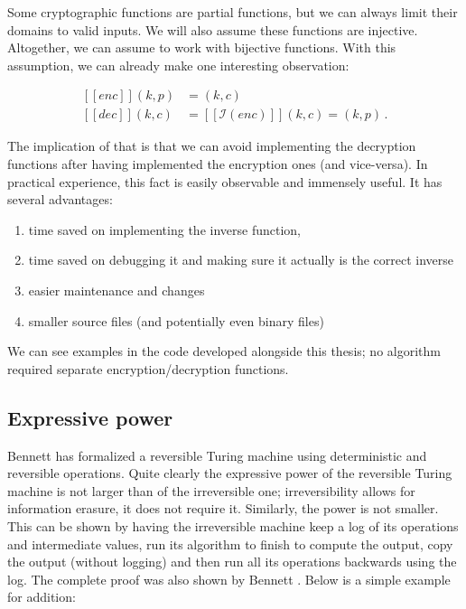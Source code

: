 \documentclass[a4paper,10pt,openright]{memoir}
\def\enc{\ensuremath{\mathit{enc}}}
\def\dec{\ensuremath{\mathit{dec}}}
\newcommand{\inv}[1]{\ensuremath{\mathcal{I}(#1)}}
\newcommand{\exe}[1]{\ensuremath{[\![#1]\!]}}
\begin{document}
Some cryptographic functions are partial functions, but we can always 
limit their domains to valid inputs. We will also assume these 
functions are injective. Altogether, we can assume to work with 
bijective functions. With this assumption, we can already make one 
interesting observation:

\begin{align*}
\exe{\enc}(k,p) &= (k,c) \\
\exe{\dec}(k,c) &= \exe{\inv{\enc}}(k,c) = (k,p) \,.
\end{align*}

The implication of that is that we can avoid implementing the 
decryption functions after having implemented the encryption ones (and 
vice-versa). In practical experience, this fact is easily observable 
and immensely useful. It has several advantages:

\begin{enumerate}
\item time saved on implementing the inverse function,
\item time saved on debugging it and making sure it actually is the correct inverse
\item easier maintenance and changes
\item smaller source files (and potentially even binary files)
\end{enumerate}

We can see examples in the code developed alongside this thesis; no 
algorithm required separate encryption/decryption functions.

\subsection{Expressive power}
\label{sec:expr-power}

Bennett has formalized \cite{Bennett73} a reversible Turing machine 
using deterministic and reversible operations. Quite clearly the 
expressive power of the reversible Turing machine is not larger than of 
the irreversible one; irreversibility allows for information erasure, 
it does not require it. Similarly, the power is not smaller. This can 
be shown by having the irreversible machine keep a log of its 
operations and intermediate values, run its algorithm to finish to 
compute the output, copy the output (without logging) and then run all 
its operations backwards using the log. The complete proof was also 
shown by Bennett \cite{Bennett73}. Below is a simple example for 
addition:
\end{document}
